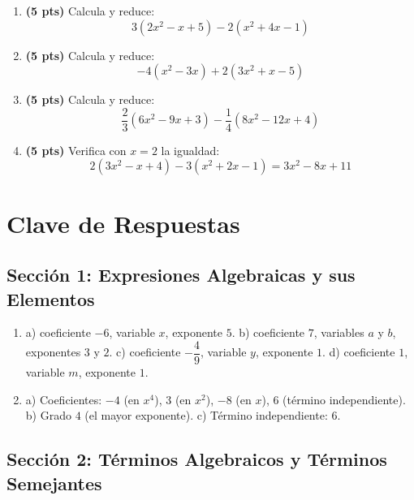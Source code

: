 \documentclass[12pt, letterpaper]{article}
\begin{document}
\begin{enumerate}[leftmargin=*]
  \item \textbf{(5 pts)} Calcula y reduce:
        \[
          3(2x^2 - x + 5) - 2(x^2 + 4x - 1)
        \]

  \item \textbf{(5 pts)} Calcula y reduce:
        \[
          -4(x^2 - 3x) + 2(3x^2 + x - 5)
        \]

  \item \textbf{(5 pts)} Calcula y reduce:
        \[
          \frac{2}{3}(6x^2 - 9x + 3) - \frac{1}{4}(8x^2 - 12x + 4)
        \]

  \item \textbf{(5 pts)} Verifica con $x = 2$ la igualdad:
        \[
          2(3x^2 - x + 4) - 3(x^2 + 2x - 1) = 3x^2 - 8x + 11
        \]
\end{enumerate}

\newpage

\ifmwclaves
  \section{Clave de Respuestas}

  \subsection*{Sección 1: Expresiones Algebraicas y sus Elementos}

  \begin{enumerate}[leftmargin=*, label=\textbf{\arabic*.}]
    \item a) coeficiente $-6$, variable $x$, exponente $5$.
          \quad b) coeficiente $7$, variables $a$ y $b$, exponentes $3$ y $2$.
          \quad c) coeficiente $-\dfrac{4}{9}$, variable $y$, exponente $1$.
          \quad d) coeficiente $1$, variable $m$, exponente $1$.

    \item a) Coeficientes: $-4$ (en $x^4$), $3$ (en $x^2$), $-8$ (en $x$), $6$ (término independiente).
          \quad b) Grado $4$ (el mayor exponente). \quad c) Término independiente: $6$.
  \end{enumerate}

  \newpage

  \subsection*{Sección 2: Términos Algebraicos y Términos Semejantes}
\end{document}
